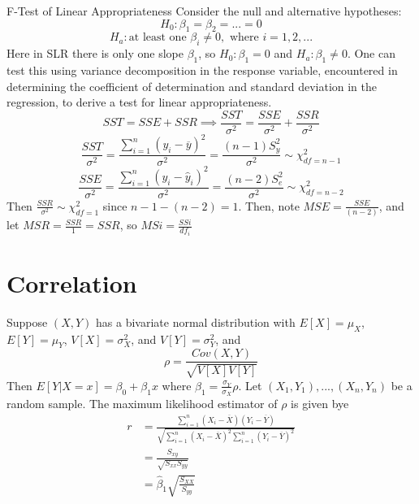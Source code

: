 \documentclass[12pt, a4paper, twoside, openright, titlepage]{book}
\begin{document}
\begin{rmk}{F-Test of Linear Appropriateness}{}
    Consider the null and alternative hypotheses: \begin{equation*}
        H_0:\beta_1=\beta_2=...=0
    \end{equation*}
    \begin{equation*}
        H_a:\text{at least one } \beta_i \neq 0,\text{ where } i = 1,2,...
    \end{equation*}
    Here in SLR there is only one slope $\beta_1$, so $H_0:\beta_1 = 0$ and $H_a:\beta_1 \neq 0$. One can test this using variance decomposition in the response variable, encountered in determining the coefficient of determination and standard deviation in the regression, to derive a test for linear appropriateness. \begin{equation*}
        SST = SSE + SSR \implies \frac{SST}{\sigma^2} = \frac{SSE}{\sigma^2} + \frac{SSR}{\sigma^2}
    \end{equation*}
    \begin{equation*}
        \frac{SST}{\sigma^2} = \frac{\sum_{i=1}^n(y_i - \overline{y})^2}{\sigma^2} = \frac{(n-1)S_y^2}{\sigma^2} \sim \chi^2_{df = n-1}
    \end{equation*}
    \begin{equation*}
        \frac{SSE}{\sigma^2} = \frac{\sum_{i=1}^n(y_i - \hat{y}_i)^2}{\sigma^2} = \frac{(n-2)S_e^2}{\sigma^2} \sim \chi^2_{df = n-2}
    \end{equation*}
    Then $\frac{SSR}{\sigma^2} \sim \chi^2_{df = 1}$ since $n-1 - (n-2) = 1$. Then, note $MSE = \frac{SSE}{(n-2)}$, and let $MSR = \frac{SSR}{1} = SSR$, so $MSi = \frac{SSi}{df_i}$
\end{rmk}





\section{\textsection Correlation}


Suppose $(X,Y)$ has a bivariate normal distribution with $E[X] = \mu_X$, $E[Y] = \mu_Y$, $V[X] = \sigma^2_X$, and $V[Y] = \sigma_Y^2$, and \begin{equation*}
    \rho = \frac{Cov(X,Y)}{\sqrt{V[X]V[Y]}}
\end{equation*}
Then $E[Y\vert X = x] = \beta_0 + \beta_1x$ where $\beta_1 = \frac{\sigma_Y}{\sigma_X}\rho$. Let $(X_1,Y_1),...,(X_n,Y_n)$ be a random sample. The maximum likelihood estimator of $\rho$ is given bye \begin{align*}
    r &= \frac{\sum_{i=1}^n(X_i-\overline{X})(Y_i-\overline{Y})}{\sqrt{\sum_{i=1}^n(X_i-\overline{X})^2\sum_{i=1}^n(Y_i-\overline{Y})^2}} \\
    &= \frac{S_{xy}}{\sqrt{S_{xx}S_{yy}}} \\
    &= \hat{\beta}_1 \sqrt{\frac{S_{XX}}{S_{yy}}}
\end{align*}
\end{document}
